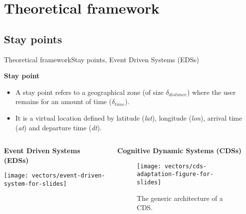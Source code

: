 \section{Theoretical framework}
\subsection{Stay points}
\begin{frame}{Theoretical framework}{Stay points, Event Driven Systems (EDSs)}
\vspace{-0.2cm}
\small
\begin{block}{\small \textbf{Stay point}}
\begin{itemize}
  \item A stay point refers to a geographical zone (of size $\delta_{distance}$) where the user remains for an amount of time ($\delta_{time}$).
  \item It is a virtual location defined by latitude (\emph{lat}), longitude (\emph{lon}), arrival time (\emph{at}) and departure time (\emph{dt}).
\end{itemize}
\end{block}

\vspace{-0.2cm}
\begin{columns}
\begin{column}{0.5\textwidth}
\begin{block}{\small \textbf{Event Driven Systems (EDSs)}}
{
    \centering
    \texttt{[image: vectors/event-driven-system-for-slides]}
    \par
}
\end{block}
\end{column}

\begin{column}{0.5\textwidth}
\begin{block}{\small \textbf{Cognitive Dynamic Systems (CDSs)}}
\begin{figure}
    \texttt{[image: vectors/cds-adaptation-figure-for-slides]}
    \caption{The generic architecture of a CDS.}
\end{figure}
\end{block}
\end{column}
\end{columns}
\end{frame}